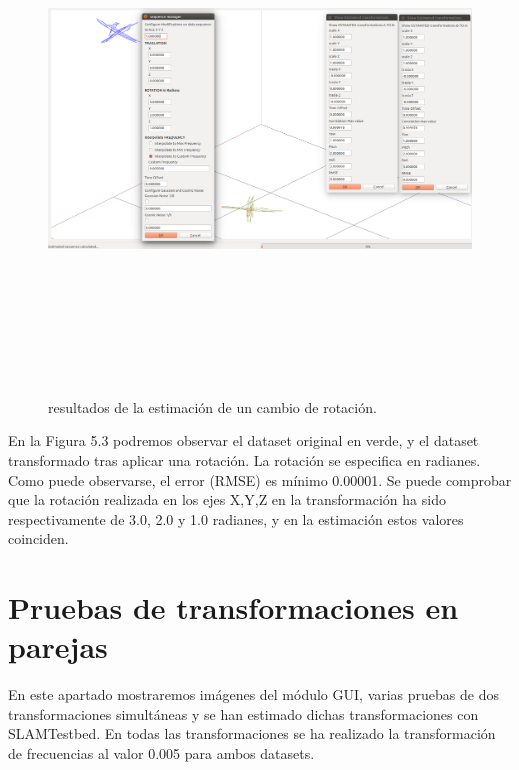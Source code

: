 \begin{figure}[H]
\label{fig:rotationTest}\includegraphics[height=14.0cm,width=18.0cm]{img/cap6/Rotation_ab_ba.png}
\hspace{0.5cm}


\caption{resultados de la estimación de un cambio de rotación.}
\end{figure}

En la Figura 5.3 podremos observar el dataset original en verde, y el dataset transformado tras aplicar una rotación. La rotación se especifica en radianes. Como puede observarse, el error (RMSE) es mínimo 0.00001. Se puede comprobar que la rotación realizada en los ejes X,Y,Z en la transformación ha sido respectivamente de 3.0, 2.0 y 1.0 radianes, y en la estimación estos valores coinciden.


\section{Pruebas de transformaciones en parejas}
En este apartado mostraremos imágenes del módulo GUI, varias pruebas de dos  transformaciones simultáneas y se han estimado dichas transformaciones con SLAMTestbed.
En todas las transformaciones se ha realizado la transformación de frecuencias al valor 0.005 para ambos datasets. 

